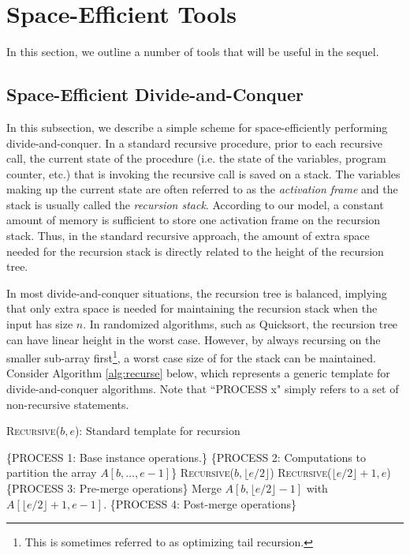 


\section{Space-Efficient Tools} \label{sec:tools}
In this section, we outline a number of tools that will be useful in the sequel.

\subsection{Space-Efficient Divide-and-Conquer}\label{sec:dc}


In this subsection, we describe a simple scheme for space-efficiently
performing divide-and-conquer. In a standard recursive procedure, prior to each
recursive call, the current state of the procedure (i.e. the state of the
variables, program counter, etc.)  that is invoking the recursive call
is saved on a stack.  The variables making up the current state are
often referred to as the {\em activation frame} and the stack is
usually called the {\em recursion stack}. According to our model, a
constant amount of memory is sufficient to store one activation frame on
the recursion stack. Thus, in the standard recursive approach, the
amount of extra space needed for the recursion stack is directly
related to the height of the recursion tree.

In most divide-and-conquer situations, the recursion tree is balanced,
implying that only  extra space is needed for maintaining
the recursion stack when the input has size $n$.  In randomized
algorithms, such as Quicksort, the recursion tree can have linear
height in the worst case. However, by always recursing on the smaller
sub-array first\footnote{This is sometimes referred to as optimizing
tail recursion.}, a worst case size of  for the stack can
be maintained\cite{huang:one-way,wegner:generalized}.  Consider
Algorithm \ref{alg:recurse} below, which represents a generic template
for divide-and-conquer algorithms.  Note that ``PROCESS x" simply
refers to a set of non-recursive statements.


\begin{algorithm}
  \caption{\textsc{Recursive}($b,e$): Standard template for recursion}
  \label{alg:recurse}
  \begin{algorithmic}[1]
    \STATE \{PROCESS 1: Base instance operations.\}
    \ELSE
    \STATE \{PROCESS 2: Computations to partition the array $A[b,\ldots,e-1]$\}
    \STATE \textsc{Recursive}($b,\lfloor e/2 \rfloor$)
    \STATE \textsc{Recursive}($\lfloor e/2 \rfloor + 1,e$)
    \STATE \{PROCESS 3: Pre-merge operations\}
    \STATE Merge $A[b,\lfloor e/2 \rfloor-1]$ with $A[\lfloor e/2
\rfloor + 1,e-1]$.
    \STATE \{PROCESS 4: Post-merge operations\}
    \ENDIF
  \end{algorithmic}
\end{algorithm}

